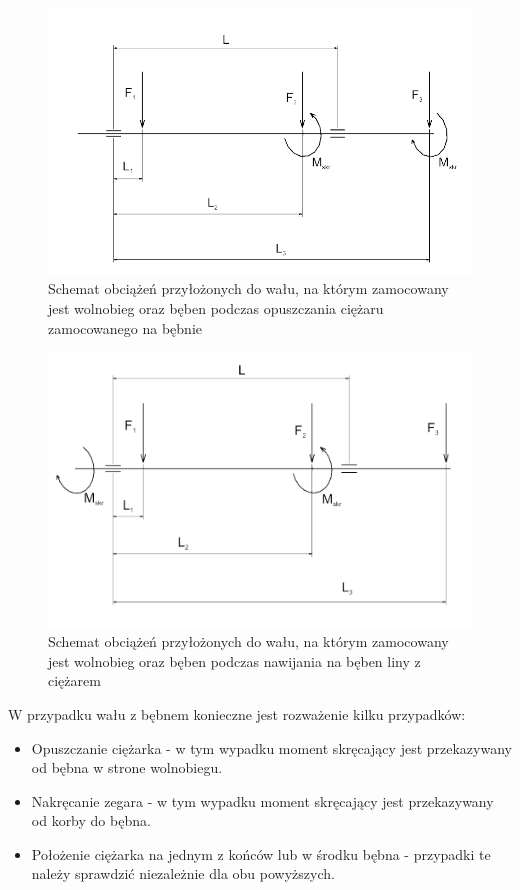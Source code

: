         	
        
        
        	\begin{figure}[th]
        		\centering
        		\includegraphics[width=0.9\linewidth]{Projekt/shaft_beben}
        		\caption{Schemat obciążeń przyłożonych do wału, na którym zamocowany jest wolnobieg oraz bęben podczas opuszczania ciężaru zamocowanego na bębnie} 
        		\label{fig::shaft_beben}
        	\end{figure}
        
        
        	\begin{figure}[th]
				\centering
				\includegraphics[width=0.9\linewidth]{Projekt/shaft_beben2}
				\caption{Schemat obciążeń przyłożonych do wału, na którym zamocowany jest wolnobieg oraz bęben podczas nawijania na bęben liny z ciężarem} 
				\label{fig::shaft_beben2}
			\end{figure}        
        
        	W przypadku wału z bębnem konieczne jest rozważenie kilku przypadków:
        \begin{itemize}
        	\item Opuszczanie ciężarka - w tym wypadku moment skręcający jest przekazywany od bębna w strone wolnobiegu.
        	\item Nakręcanie zegara - w tym wypadku moment skręcający jest przekazywany od korby do bębna.
        	\item Położenie ciężarka na jednym z końców lub w środku bębna - przypadki te należy sprawdzić niezależnie dla obu powyższych.
        \end{itemize}
        
